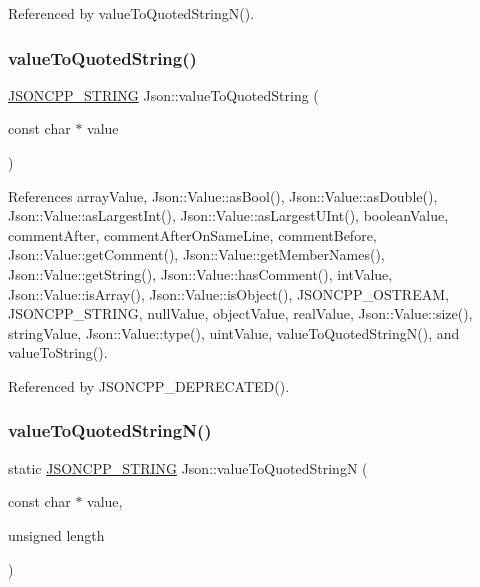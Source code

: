Referenced by value\+To\+Quoted\+String\+N().

\mbox{\label{namespaceJson_aaf777a6923bcb4cf63a2729973fe5315_aaf777a6923bcb4cf63a2729973fe5315}} 
\subsubsection{\texorpdfstring{value\+To\+Quoted\+String()}{valueToQuotedString()}}
{\footnotesize\ttfamily \hyperlink{json_8h_a1e723f95759de062585bc4a8fd3fa4be_a1e723f95759de062585bc4a8fd3fa4be}{J\+S\+O\+N\+C\+P\+P\+\_\+\+S\+T\+R\+I\+NG} Json\+::value\+To\+Quoted\+String (\begin{DoxyParamCaption}\item[{const char $\ast$}]{value }\end{DoxyParamCaption})}



References array\+Value, Json\+::\+Value\+::as\+Bool(), Json\+::\+Value\+::as\+Double(), Json\+::\+Value\+::as\+Largest\+Int(), Json\+::\+Value\+::as\+Largest\+U\+Int(), boolean\+Value, comment\+After, comment\+After\+On\+Same\+Line, comment\+Before, Json\+::\+Value\+::get\+Comment(), Json\+::\+Value\+::get\+Member\+Names(), Json\+::\+Value\+::get\+String(), Json\+::\+Value\+::has\+Comment(), int\+Value, Json\+::\+Value\+::is\+Array(), Json\+::\+Value\+::is\+Object(), J\+S\+O\+N\+C\+P\+P\+\_\+\+O\+S\+T\+R\+E\+AM, J\+S\+O\+N\+C\+P\+P\+\_\+\+S\+T\+R\+I\+NG, null\+Value, object\+Value, real\+Value, Json\+::\+Value\+::size(), string\+Value, Json\+::\+Value\+::type(), uint\+Value, value\+To\+Quoted\+String\+N(), and value\+To\+String().



Referenced by J\+S\+O\+N\+C\+P\+P\+\_\+\+D\+E\+P\+R\+E\+C\+A\+T\+E\+D().

\mbox{\label{namespaceJson_a29aff81733b8fdaabf3f1acfc3ad339f_a29aff81733b8fdaabf3f1acfc3ad339f}} 
\subsubsection{\texorpdfstring{value\+To\+Quoted\+String\+N()}{valueToQuotedStringN()}}
{\footnotesize\ttfamily static \hyperlink{json_8h_a1e723f95759de062585bc4a8fd3fa4be_a1e723f95759de062585bc4a8fd3fa4be}{J\+S\+O\+N\+C\+P\+P\+\_\+\+S\+T\+R\+I\+NG} Json\+::value\+To\+Quoted\+StringN (\begin{DoxyParamCaption}\item[{const char $\ast$}]{value,  }\item[{unsigned}]{length }\end{DoxyParamCaption})\hspace{0.3cm}{\ttfamily [static]}}



